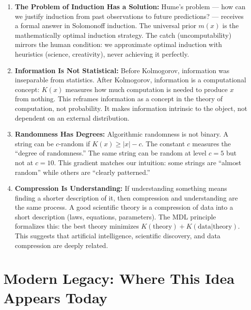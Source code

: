 \begin{enumerate}
\item \textbf{The Problem of Induction Has a Solution:} Hume's problem --- how can we justify induction from past observations to future predictions? --- receives a formal answer in Solomonoff induction. The universal prior $m(x)$ is the mathematically optimal induction strategy. The catch (uncomputability) mirrors the human condition: we approximate optimal induction with heuristics (science, creativity), never achieving it perfectly.

\item \textbf{Information Is Not Statistical:} Before Kolmogorov, information was inseparable from statistics. After Kolmogorov, information is a computational concept: $K(x)$ measures how much computation is needed to produce $x$ from nothing. This reframes information as a concept in the theory of computation, not probability. It makes information intrinsic to the object, not dependent on an external distribution.

\item \textbf{Randomness Has Degrees:} Algorithmic randomness is not binary. A string can be $c$-random if $K(x) \ge |x| - c$. The constant $c$ measures the ``degree of randomness.'' The same string can be random at level $c = 5$ but not at $c = 10$. This gradient matches our intuition: some strings are ``almost random'' while others are ``clearly patterned.''

\item \textbf{Compression Is Understanding:} If understanding something means finding a shorter description of it, then compression and understanding are the same process. A good scientific theory is a compression of data into a short description (laws, equations, parameters). The MDL principle formalizes this: the best theory minimizes $K(\text{theory}) + K(\text{data}|\text{theory})$. This suggests that artificial intelligence, scientific discovery, and data compression are deeply related.
\end{enumerate}

\section{Modern Legacy: Where This Idea Appears Today}
\label{sec:kolmogorov:legacy}

